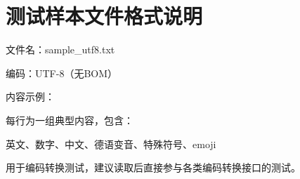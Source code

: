 \chapter{测试样本文件格式说明}
\hypertarget{md_testdata_2sample__format}{}\label{md_testdata_2sample__format}
\label{md_testdata_2sample__format_autotoc_md71}%
%



\begin{DoxyItemize}
\item 文件名：sample\+\_\+utf8.\+txt
\item 编码：\+UTF-\/8（无\+BOM）
\item 内容示例：
\end{DoxyItemize}


\begin{DoxyCode}{0}

\end{DoxyCode}



\begin{DoxyItemize}
\item 每行为一组典型内容，包含：
\begin{DoxyItemize}
\item 英文、数字、中文、德语变音、特殊符号、emoji
\end{DoxyItemize}
\item 用于编码转换测试，建议读取后直接参与各类编码转换接口的测试。 
\end{DoxyItemize}